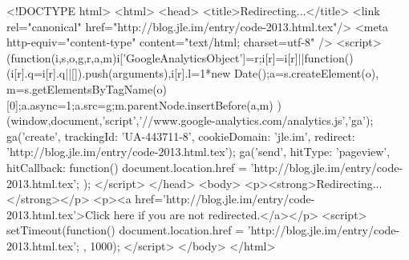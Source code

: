 <!DOCTYPE html>
<html>
<head>
<title>Redirecting...</title>
<link rel="canonical" href="http://blog.jle.im/entry/code-2013.html.tex"/>
<meta http-equiv="content-type" content="text/html; charset=utf-8" />
<script>
(function(i,s,o,g,r,a,m){i['GoogleAnalyticsObject']=r;i[r]=i[r]||function(){
(i[r].q=i[r].q||[]).push(arguments)},i[r].l=1*new Date();a=s.createElement(o),
m=s.getElementsByTagName(o)[0];a.async=1;a.src=g;m.parentNode.insertBefore(a,m)
})(window,document,'script','//www.google-analytics.com/analytics.js','ga');
ga('create', { trackingId: 'UA-443711-8', cookieDomain: 'jle.im', redirect: 'http://blog.jle.im/entry/code-2013.html.tex'});
ga('send', { hitType: 'pageview', hitCallback: function() { document.location.href = 'http://blog.jle.im/entry/code-2013.html.tex'; } });
</script>
</head>
<body>
  <p><strong>Redirecting...</strong></p>
  <p><a href='http://blog.jle.im/entry/code-2013.html.tex'>Click here if you are not redirected.</a></p>
  <script>
    setTimeout(function() { document.location.href = 'http://blog.jle.im/entry/code-2013.html.tex'; }, 1000);
  </script>
</body>
</html>
